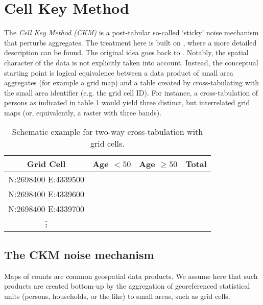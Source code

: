 \section{Cell Key Method} \label{sec:ckm}

The \emph{Cell Key Method (CKM)} is a post-tabular so-called `sticky' noise mechanism that perturbs aggregates. The treatment here is built on \citet[5.4]{HundepoolEtAl2024}, where a more detailed description can be found. The original idea goes back to \citet{FraserWooton2005}.
Notably, the spatial character of the data is not explicitly taken into account. Instead, the conceptual starting point is logical equivalence between a data product of small area aggregates (for example a grid map) and a table created by cross-tabulating with the small area identifier (e.g. the grid cell ID).
For instance, a cross-tabulation of persons as indicated in table \ref{tab:intro_exa} would yield three distinct, but interrelated grid maps (or, equivalently, a raster with three bands).

\begin{table}[H]
    \centering
    \begin{tabular}{| c | c c | c |}
    \hline
        Grid Cell & Age $< 50$ & Age $\geq 50$ & Total\\
    \hline
         N:2698400 E:4339500 &  &  & \\
         N:2698400 E:4339600 &  &  & \\
         N:2698400 E:4339700 &  &  & \\
         \vdots & & & \\
    \end{tabular}
    \caption{Schematic example for two-way cross-tabulation with grid cells.
    }
    \label{tab:intro_exa}
\end{table}


\subsection{The CKM noise mechanism} \label{sec:ckm_mecha}

Maps of counts are common geospatial data products. We assume here that such products are created bottom-up by the aggregation of georeferenced statistical units (persons, households, or the like) to small areas, such as grid cells.

